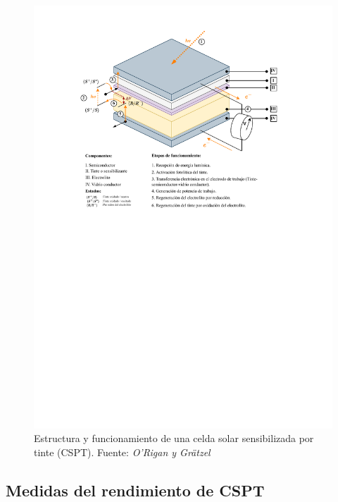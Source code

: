 \begin{figure}[!thb]
    \begin{center}
        \includegraphics[clip, trim=0.5cm 14cm 0.5cm 1cm, width=1.00\textwidth]{img/diagrama_tesis.pdf}
    \end{center}
    \caption{Estructura y funcionamiento de una celda solar sensibilizada por tinte (CSPT). Fuente: \textit{O'Rigan y Grätzel} \cite{o1991low}}
    \label{img:CSPT}
\end{figure}


\subsection{Medidas del rendimiento de CSPT}

